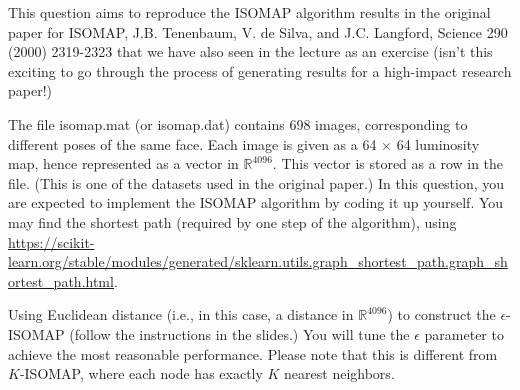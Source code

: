 \documentclass[twoside,10pt]{article}
\begin{document}
This question aims to reproduce the ISOMAP algorithm results in the original paper for ISOMAP, J.B. Tenenbaum, V. de Silva, and J.C. Langford, Science 290 (2000) 2319-2323 that we have also seen in the lecture as an exercise (isn't this exciting to go through the process of generating results for a high-impact research paper!) 


The file \textsf{isomap.mat} (or \textsf{isomap.dat}) contains 698 images, corresponding to different poses of the same face. Each image is given as a 64 $\times$ 64 luminosity map, hence represented as a vector in $\mathbb R^{4096}$. This vector is stored as a row in the file. (This is one of the datasets used in the original paper.) In this question, you are expected to implement the ISOMAP algorithm by coding it up yourself. You may find the shortest path (required by one step of the algorithm), using \url{https://scikit-learn.org/stable/modules/generated/sklearn.utils.graph\_shortest\_path.graph\_shortest_path.html}. 

Using Euclidean distance (i.e., in this case, a distance in $\mathbb R^{4096}$) to construct the $\epsilon$-ISOMAP (follow the instructions in the slides.) You will tune the $\epsilon$ parameter to achieve the most reasonable performance. Please note that this is different from $K$-ISOMAP, where each node has exactly $K$ nearest neighbors.
\end{document}
